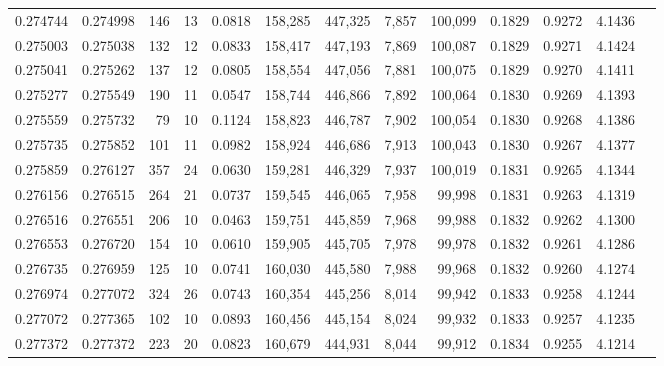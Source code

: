 \begin{tabular}{rrrrrrrrrrrrr}
0.274744 & 0.274998 &   146 &  13 &                                     0.0818 & 158,285 & 447,325 &   7,857 & 100,099 & 0.1829 & 0.9272 & 4.1436 \\
0.275003 & 0.275038 &   132 &  12 &                                     0.0833 & 158,417 & 447,193 &   7,869 & 100,087 & 0.1829 & 0.9271 & 4.1424 \\
0.275041 & 0.275262 &   137 &  12 &                                     0.0805 & 158,554 & 447,056 &   7,881 & 100,075 & 0.1829 & 0.9270 & 4.1411 \\
0.275277 & 0.275549 &   190 &  11 &                                     0.0547 & 158,744 & 446,866 &   7,892 & 100,064 & 0.1830 & 0.9269 & 4.1393 \\
0.275559 & 0.275732 &    79 &  10 &                                     0.1124 & 158,823 & 446,787 &   7,902 & 100,054 & 0.1830 & 0.9268 & 4.1386 \\
0.275735 & 0.275852 &   101 &  11 &                                     0.0982 & 158,924 & 446,686 &   7,913 & 100,043 & 0.1830 & 0.9267 & 4.1377 \\
0.275859 & 0.276127 &   357 &  24 &                                     0.0630 & 159,281 & 446,329 &   7,937 & 100,019 & 0.1831 & 0.9265 & 4.1344 \\
0.276156 & 0.276515 &   264 &  21 &                                     0.0737 & 159,545 & 446,065 &   7,958 &  99,998 & 0.1831 & 0.9263 & 4.1319 \\
0.276516 & 0.276551 &   206 &  10 &                                     0.0463 & 159,751 & 445,859 &   7,968 &  99,988 & 0.1832 & 0.9262 & 4.1300 \\
0.276553 & 0.276720 &   154 &  10 &                                     0.0610 & 159,905 & 445,705 &   7,978 &  99,978 & 0.1832 & 0.9261 & 4.1286 \\
0.276735 & 0.276959 &   125 &  10 &                                     0.0741 & 160,030 & 445,580 &   7,988 &  99,968 & 0.1832 & 0.9260 & 4.1274 \\
0.276974 & 0.277072 &   324 &  26 &                                     0.0743 & 160,354 & 445,256 &   8,014 &  99,942 & 0.1833 & 0.9258 & 4.1244 \\
0.277072 & 0.277365 &   102 &  10 &                                     0.0893 & 160,456 & 445,154 &   8,024 &  99,932 & 0.1833 & 0.9257 & 4.1235 \\
0.277372 & 0.277372 &   223 &  20 &                                     0.0823 & 160,679 & 444,931 &   8,044 &  99,912 & 0.1834 & 0.9255 & 4.1214 \\

\end{tabular}
